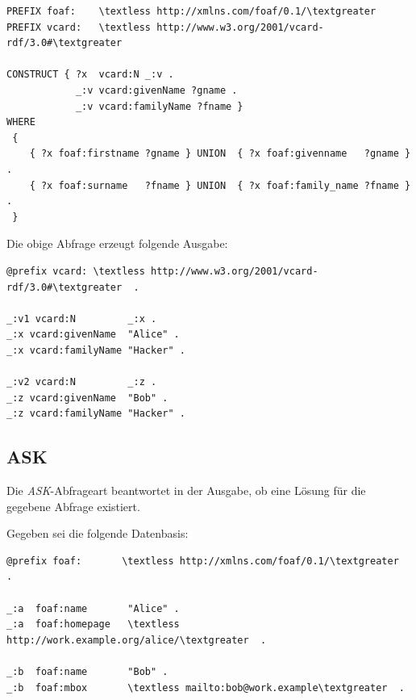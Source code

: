 \begin{lstlisting}
PREFIX foaf:    \textless http://xmlns.com/foaf/0.1/\textgreater 
PREFIX vcard:   \textless http://www.w3.org/2001/vcard-rdf/3.0#\textgreater 

CONSTRUCT { ?x  vcard:N _:v .
            _:v vcard:givenName ?gname .
            _:v vcard:familyName ?fname }
WHERE
 {
    { ?x foaf:firstname ?gname } UNION  { ?x foaf:givenname   ?gname } .
    { ?x foaf:surname   ?fname } UNION  { ?x foaf:family_name ?fname } .
 }
\end{lstlisting}

Die obige Abfrage erzeugt folgende Ausgabe:
\begin{lstlisting}
@prefix vcard: \textless http://www.w3.org/2001/vcard-rdf/3.0#\textgreater  .

_:v1 vcard:N         _:x .
_:x vcard:givenName  "Alice" .
_:x vcard:familyName "Hacker" .

_:v2 vcard:N         _:z .
_:z vcard:givenName  "Bob" .
_:z vcard:familyName "Hacker" .
\end{lstlisting}

\subsection{ASK}
\label{subsec:sparql_abfragearten_ask}
Die \textit{ASK}-Abfrageart beantwortet in der Ausgabe, ob eine Lösung für die gegebene Abfrage existiert.

Gegeben sei die folgende Datenbasis:
\lstset{language=XML}
\begin{lstlisting}
@prefix foaf:       \textless http://xmlns.com/foaf/0.1/\textgreater  .

_:a  foaf:name       "Alice" .
_:a  foaf:homepage   \textless http://work.example.org/alice/\textgreater  .

_:b  foaf:name       "Bob" .
_:b  foaf:mbox       \textless mailto:bob@work.example\textgreater  .
\end{lstlisting}

